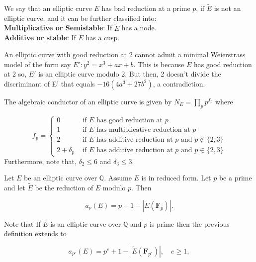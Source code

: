    \begin{definition}
           We say that an elliptic curve $E$ has bad reduction at a prime $p$, if \(\widetilde{E}\) is not an elliptic curve. and it can be further classified into: \\
   \textbf{Multiplicative or Semistable}: If \(\widetilde{E}\) has a node. \\
\textbf{Additive or stable}: If \(\widetilde{E}\) has a cusp.

   \end{definition}
\begin{remark}
    An elliptic curve with good reduction at 2 cannot admit a minimal Weierstrass model of the form say $E': y^2=x^3+ax+b.$ This is because $E$ has good reduction at 2 so, $E'$ is an elliptic curve modulo 2. But then, 2 doesn't divide the discriminant of E' that equals $-16(4a^3+27b^2)$, a contradiction.
\end{remark}
\begin{definition}
    The algebraic conductor of an elliptic curve is given by $N_{E}=\prod_{p} p^{f_{p}}$ where

$$
f_{p}= \begin{cases}0 & \text { if } E \text { has good reduction at } p \\ 1 & \text { if } E \text { has multiplicative reduction at } p \\ 2 & \text { if } E \text { has additive reduction at } p \text { and } p \notin\{2,3\} \\ 2+\delta_{p} & \text { if } E \text { has additive reduction at } p \text { and } p \in\{2,3\}\end{cases}
$$
Furthermore, note that, $\delta_{2} \leq 6$ and $\delta_{3} \leq 3$.

\end{definition}

\begin{definition}
    Let $E$ be an elliptic curve over $\mathbb{Q}$. Assume $E$ is in reduced form. Let $p$ be a prime and let $\widetilde{E}$ be the reduction of $E$ modulo $p$. Then

$$
a_{p}(E)=p+1-\left|\widetilde{E}\left(\mathbf{F}_{p}\right)\right| .
$$

\end{definition}

Note that If $E$ is an elliptic curve over $\mathbb{Q}$ and $p$ is prime then the previous definition extends to 

$$
a_{p^{e}}(E)=p^{e}+1-\left|\widetilde{E}\left(\mathbf{F}_{p^{e}}\right)\right|, \quad e \geq 1,
$$


